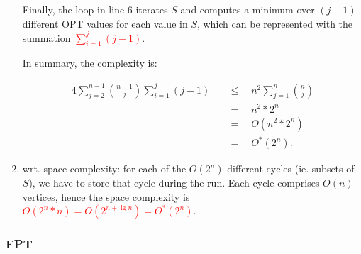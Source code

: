 \begin{enumerate}
    Finally, the loop in line 6 iterates $S$ and computes a minimum over $(j-1)$
    different OPT values for each value in $S$, which can be represented with
    the summation \textcolor{red}{$\sum_{i = 1}^j (j - 1)$}.

    In summary, the complexity is:

    \begin{textred}
    \begin{alignat*}{4}
      \sum_{j = 2}^{n - 1}\binom{n - 1}{j}\sum_{i = 1}^j (j - 1)\quad&\leq\quad
      n^2\sum_{j = 1}^n\binom{n}{j}\\
      &=\quad n^2*2^n\\
      &=\quad O(n^2*2^n)\\
      &=\quad O^\ast(2^n).
    \end{alignat*}
    \end{textred}


  \item wrt. space complexity: for each of the $O(2^n)$ different cycles (ie.
    subsets of $S$), we have to store that cycle during the run. Each cycle
    comprises $O(n)$ vertices, hence the space complexity is \textcolor{red}{$O(2^n * n) =
    O(2^{n + \lg n}) = O^\ast(2^n)$}.
\end{enumerate}

\subsubsection{FPT}


